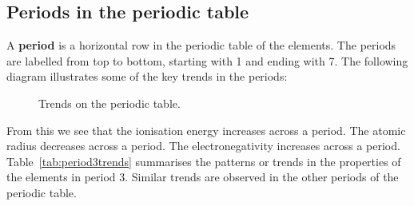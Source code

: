             \subsection*{Periods in the periodic table}
            \nopagebreak
            \label{m38760*id261855}A \textbf{period} is a horizontal row in the periodic table of the elements. The periods are labelled from top to bottom, starting with 1 and ending with 7. The following diagram illustrates some of the key trends in the periods: \\
\begin{figure}[H]

\begin{center}
\end{center}

\caption{Trends on the periodic table.}
\label{fig:atom:periodic2}
 \end{figure} 
From this we see that the ionisation energy increases across a period. The atomic radius decreases across a period. The electronegativity increases across a period. Table~\ref{tab:period3trends} summarises the patterns or trends in the properties of the elements in period 3. Similar trends are observed in the other periods of the periodic table. \\
